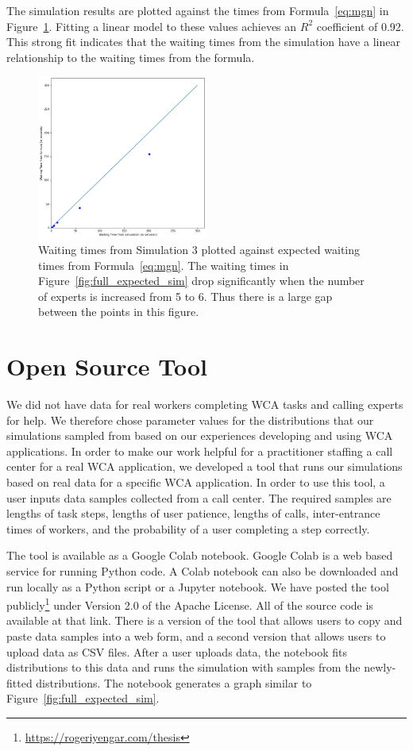 The simulation results are plotted against the times from Formula~\ref{eq:mgn}
in Figure~\ref{fig:gof}.
Fitting a linear model to these values achieves an $R^2$ coefficient of 0.92.
This strong fit indicates that the waiting times from the simulation have a
linear relationship to the waiting times from the formula.

\begin{figure}[h]
  \includegraphics[width=0.5\textwidth]{figures/montecarlo/gof.png}
  \caption{
    Waiting times from Simulation 3 plotted against expected
    waiting times from Formula~\ref{eq:mgn}.
    The waiting times in Figure~\ref{fig:full_expected_sim} drop significantly
    when the number of experts is increased from 5 to 6.
    Thus there is a large gap between the points in this figure.
  }\label{fig:gof}
\end{figure}

\section{Open Source Tool}

We did not have data for real workers completing WCA tasks and calling experts
for help.
We therefore chose parameter values for the distributions that our simulations
sampled from based on our experiences developing and using WCA applications.
In order to make our work helpful for a practitioner staffing a call center for
a real WCA application, we developed a tool that runs our simulations based on
real data for a specific WCA application.
In order to use this tool, a user inputs data samples collected from a call
center.
The required samples are lengths of task steps, lengths of user patience,
lengths of calls, inter-entrance times of workers, and the probability of a user
completing a step correctly.

The tool is available as a Google Colab notebook.
Google Colab is a web based service for running Python code.
A Colab notebook can also be downloaded and run locally as a Python script or a
Jupyter notebook.
We have posted the tool
publicly\footnote{\url{https://rogeriyengar.com/thesis}} under Version 2.0 of
the Apache License.
All of the source code is available at that link.
There is a version of the tool that allows users to copy and paste data samples
into a web form, and a second version that allows users to upload data as CSV
files.
After a user uploads data, the notebook fits distributions to this data and
runs the simulation with samples from the newly-fitted distributions.
The notebook generates a graph similar to Figure~\ref{fig:full_expected_sim}.

